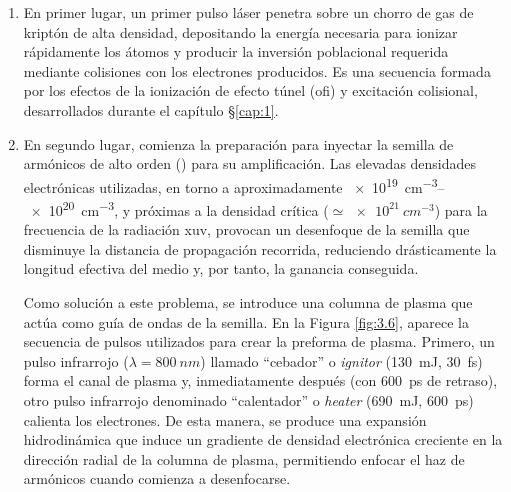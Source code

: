 \begin{enumerate}

    \item En primer lugar, un primer pulso láser penetra sobre un chorro de gas de kriptón de alta densidad, depositando la energía necesaria para ionizar rápidamente los átomos y producir la inversión poblacional requerida mediante colisiones con los electrones producidos. Es una secuencia formada por los efectos de la ionización de efecto túnel (\acrshort{ofi}) y excitación colisional, desarrollados durante el capítulo \S\ref{cap:1}.
    \item En segundo lugar, comienza la preparación para inyectar la semilla de armónicos de alto orden () para su amplificación. Las elevadas densidades electrónicas utilizadas, en torno a aproximadamente \qtyrange{e19}{e20}{cm^{-3}}\autocite{Tuitje2020}, y próximas a la densidad crítica ($\simeq \qty{e21}{cm^{-3}}$) para la frecuencia de la radiación \acrshort{xuv}, provocan un desenfoque de la semilla que disminuye la distancia de propagación recorrida, reduciendo drásticamente la longitud efectiva del medio y, por tanto, la ganancia conseguida.

      Como solución a este problema, se introduce una columna de plasma que actúa como guía de ondas de la semilla\autocite{Depresseux2015}. En la Figura \ref{fig:3.6}, aparece la secuencia de pulsos utilizados para crear la preforma de plasma. Primero, un pulso infrarrojo ($\lambda = \qty{800}{nm}$) llamado \enquote{cebador} o \emph{ignitor} (\qty{130}{mJ}, \qty{30}{fs}) forma el canal de plasma y, inmediatamente después (con \qty{600}{ps} de retraso), otro pulso infrarrojo denominado \enquote{calentador} o \emph{heater} (\qty{690}{mJ}, \qty{600}{ps}) calienta los electrones. De esta manera, se produce una expansión hidrodinámica que induce un gradiente de densidad electrónica creciente en la dirección radial de la columna de plasma, permitiendo enfocar el haz de armónicos cuando comienza a desenfocarse.


\end{enumerate}
